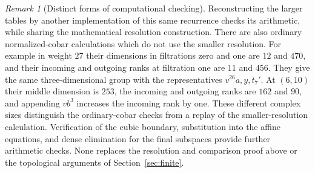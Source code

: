 \documentclass[11pt]{article}
\theoremstyle{definition}
\theoremstyle{remark}
\newtheorem{remark}[theorem]{Remark}
\numberwithin{equation}{section}
\begin{document}
\begin{remark}[Distinct forms of computational checking]
Reconstructing the larger tables by another implementation of this
same recurrence checks its arithmetic, while sharing the mathematical
resolution construction.  There are also ordinary normalized-cobar
calculations which do not use the smaller resolution.  For example
in weight $27$ their dimensions in filtrations zero and one are $12$
and $470$, and their incoming and outgoing ranks at filtration one
are $11$ and $456$.  They give the same three-dimensional group with
the representatives $v^{26}a,y,t_7'$.  At $(6,10)$ their middle
dimension is $253$, the incoming and outgoing ranks are $162$ and
$90$, and appending $vb^3$ increases the incoming rank by one.
These different complex sizes distinguish the ordinary-cobar checks
from a replay of the smaller-resolution calculation.  Verification of
the cubic boundary, substitution into the affine equations, and dense
elimination for the final subspaces provide further arithmetic
checks.  None replaces the resolution and comparison proof above or
the topological arguments of Section~\ref{sec:finite}.
\end{remark}
\end{document}
